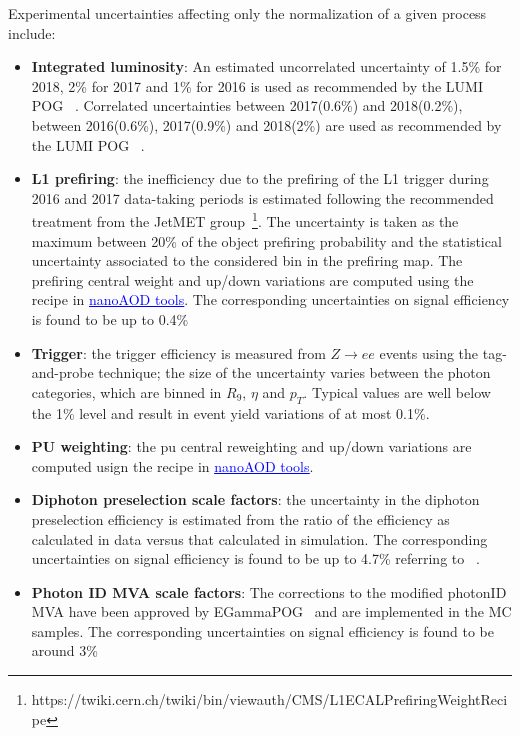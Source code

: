 Experimental uncertainties affecting only the normalization of a given process include:
\begin{itemize}
    \item \textbf{Integrated luminosity}: An estimated uncorrelated uncertainty of 1.5\% for 2018, 2\% for 2017 and 1\% for 2016 is used  as recommended by the LUMI POG ~\cite{CMS-LUM-17-003,CMS-PAS-LUM-17-004,CMS-PAS-LUM-18-002}. Correlated uncertainties between 2017(0.6\%) and 2018(0.2\%), between 2016(0.6\%), 2017(0.9\%) and 2018(2\%) are used as recommended by the LUMI POG ~\cite{CMS:LUMI}.
    \item \textbf{L1 prefiring}: the inefficiency due to the prefiring of the L1 trigger during 2016 and 2017 data-taking periods is estimated following the recommended treatment from the JetMET group~\footnote{https://twiki.cern.ch/twiki/bin/viewauth/CMS/L1ECALPrefiringWeightRecipe}. The uncertainty is taken as the maximum between 20\% of the object prefiring probability and the statistical uncertainty associated to the considered bin in the prefiring map. The prefiring central weight and up/down variations are computed using the recipe in \href{https://github.com/cms-nanoAOD/nanoAOD-tools}{\textcolor{blue}{\underline{nanoAOD tools}}}. The corresponding uncertainties on signal efficiency is found to be up to 0.4\%
    \item \textbf{Trigger}: the trigger efficiency is measured from $Z \to ee$ events using the tag-and-probe technique; the size of the uncertainty varies between the photon categories, which are binned in $R_9$, $\eta$ and $p_T$. Typical values are well below the 1\% level and result in event yield variations of at most 0.1\%.
    \item \textbf{PU weighting}: the pu central reweighting and up/down variations are computed usign the recipe in \href{https://github.com/cms-nanoAOD/nanoAOD-tools}{\textcolor{blue}{\underline{nanoAOD tools}}}.
	\item \textbf{Diphoton preselection scale factors}: the uncertainty in the diphoton preselection efficiency is estimated from the ratio of the efficiency as calculated in data versus that calculated in simulation. The corresponding uncertainties on signal efficiency is found to be up to 4.7\% referring to ~\cite{AN-21-025}.
	\item \textbf{Photon ID MVA scale factors}: The corrections to the modified photonID MVA have been approved by EGammaPOG~\cite{CMS:Egammameetingmodifiedmvasf} and are implemented in the MC samples. The corresponding uncertainties on signal efficiency is found to be around 3\%

\end{itemize}
